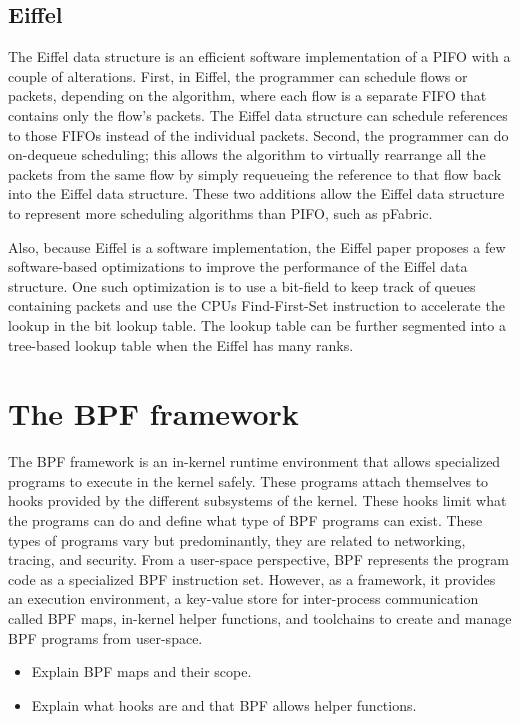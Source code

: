 \documentclass[sigconf, nonacm]{acmart}
\begin{document}
\subsection{Eiffel} \label{sec:eiffel}

The Eiffel data structure is an efficient software implementation of a PIFO with a couple of alterations. First, in Eiffel, the programmer can schedule flows or packets, depending on the algorithm, where each flow is a separate FIFO that contains only the flow's packets. The Eiffel data structure can schedule references to those FIFOs instead of the individual packets. Second, the programmer can do on-dequeue scheduling; this allows the algorithm to virtually rearrange all the packets from the same flow by simply requeueing the reference to that flow back into the Eiffel data structure. These two additions allow the Eiffel data structure to represent more scheduling algorithms than PIFO, such as pFabric\cite{alizadeh2013pfabric}.

Also, because Eiffel is a software implementation, the Eiffel paper proposes a few software-based optimizations to improve the performance of the Eiffel data structure. One such optimization is to use a bit-field to keep track of queues containing packets and use the CPUs Find-First-Set instruction to accelerate the lookup in the bit lookup table. The lookup table can be further segmented into a tree-based lookup table when the Eiffel has many ranks.


\section{The BPF framework}

The BPF framework is an in-kernel runtime environment that allows specialized programs to execute in the kernel safely. These programs attach themselves to hooks provided by the different subsystems of the kernel. These hooks limit what the programs can do and define what type of BPF programs can exist. These types of programs vary but predominantly, they are related to networking, tracing, and security. From a user-space perspective, BPF represents the program code as a specialized BPF instruction set. However, as a framework, it provides an execution environment, a key-value store for inter-process communication called BPF maps, in-kernel helper functions, and toolchains to create and manage BPF programs from user-space.

\begin{itemize}
  \item Explain BPF maps and their scope.
  \item Explain what hooks are and that BPF allows helper functions.
\end{itemize}
\end{document}
